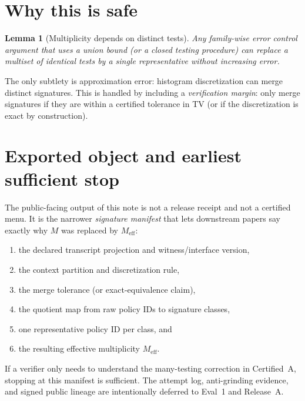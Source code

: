 \documentclass[11pt]{article}
\newtheorem{lemma}{Lemma}
\begin{document}
\section{Why this is safe}
\begin{lemma}[Multiplicity depends on distinct tests]
Any family-wise error control argument that uses a union bound (or a closed testing procedure) can replace a multiset of identical tests by a single representative without increasing error.
\end{lemma}

The only subtlety is approximation error: histogram discretization can merge distinct signatures.
This is handled by including a \emph{verification margin}: only merge signatures if they are within a certified tolerance in TV (or if the discretization is exact by construction).

\section{Exported object and earliest sufficient stop}
The public-facing output of this note is not a release receipt and not a certified menu.
It is the narrower \emph{signature manifest} that lets downstream papers say exactly why $M$ was replaced by $M_{\mathrm{eff}}$:
\begin{enumerate}[leftmargin=*]
\item the declared transcript projection and witness/interface version,
\item the context partition and discretization rule,
\item the merge tolerance (or exact-equivalence claim),
\item the quotient map from raw policy IDs to signature classes,
\item one representative policy ID per class, and
\item the resulting effective multiplicity $M_{\mathrm{eff}}$.
\end{enumerate}
If a verifier only needs to understand the many-testing correction in Certified~A, stopping at this manifest is sufficient.
The attempt log, anti-grinding evidence, and signed public lineage are intentionally deferred to Eval~1 and Release~A.\cite{series:eval1,series:releaseA}
\end{document}
